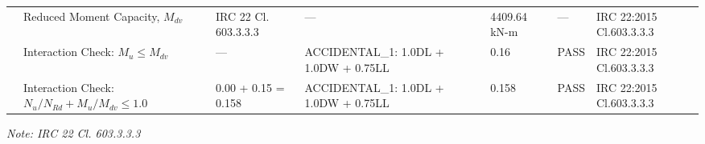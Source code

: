 \documentclass[12pt,a4paper]{report}
\numberwithin{table}{chapter}
\numberwithin{figure}{chapter}
\begin{document}
\begin{longtable}{|C{1.3cm}|C{2.5cm}|C{2.3cm}|>{\centering\arraybackslash}p{3.0cm}|C{2.4cm}|C{1.4cm}|C{2.4cm}|}
 & Reduced Moment Capacity, $M_{dv}$ & IRC 22 Cl. 603.3.3.3 & --- & 4409.64 kN-m & --- & IRC 22:2015 Cl.603.3.3.3 \\[6pt]
 & Interaction Check: $M_u \leq M_{dv}$ & --- & ACCIDENTAL\_\allowbreak{}1:\allowbreak{} 1.0DL + 1.0DW + 0.75LL & 0.16 & PASS & IRC 22:2015 Cl.603.3.3.3 \\[6pt]
 & Interaction Check: $N_u/N_{Rd} + M_u/M_{dv} \leq 1.0$ & 0.00 + 0.15 = 0.158 & ACCIDENTAL\_\allowbreak{}1:\allowbreak{} 1.0DL + 1.0DW + 0.75LL & 0.158 & PASS & IRC 22:2015 Cl.603.3.3.3 \\[6pt]
\hline
\end{longtable}
\noindent\textit{Note: IRC 22 Cl. 603.3.3.3}

\vspace{1em}
\end{document}
